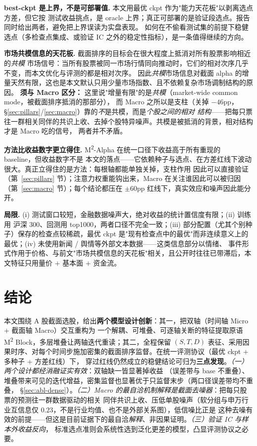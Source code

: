 \documentclass[a4paper,11pt,fontset=fandol]{ctexart}
\newcommand{\msq}{\texorpdfstring{M\textsuperscript{2}}{M2}}  %
\newcommand{\msqa}{\texorpdfstring{M\textsuperscript{2}-Alpha}{M2-Alpha}} %
\begin{document}
\textbf{\heiti best-ckpt 是上界，不是可部署值.} 本文用最优 ckpt 作为"能力天花板"以剥离选点方差，但它按
测试收益挑点，是 oracle 上界；真正可部署的是验证段选点。报告同时给出两者，避免把上界误读为实盘表现。
如何在不偷看测试集的前提下稳健选点（多检查点集成、或验证 IC 之外的稳定性指标），是一条值得继续的方向。

\textbf{\heiti 市场共模信息的天花板.} 截面排序的目标会在很大程度上抵消对所有股票影响相近的\emph{共模}
市场信号：当所有股票被同一市场行情同向推动时，它们的相对次序几乎不变，而本文优化与评测的都是相对次序。
因此\emph{共模}市场信息对截面 alpha 的增量天然有限，这也是本文默认只用少量市场指数、且不依赖复杂市场调制结构的原因。
\textbf{\heiti 须与 Macro 区分：} 这里说"增量有限"的是\emph{共模}（market-wide common mode，被截面排序抵消的那部分），
而 Macro 之所以是支柱（关掉 $-46$pp，§\ref{sec:pillars}/\ref{sec:macro}）靠的\emph{不}是共模，而是\emph{个股之间的相对
结构}——把每只票往一群相关同伴的共识上收、去掉个股特异噪声。共模是被抵消的背景，相对结构才是 Macro 吃的信号，
两者并不矛盾。

\textbf{\heiti 方法比收益数字更立得住.} \msqa{} 在统一口径下收益高于所有重现的 baseline，但收益数字不是
本文的落点——它依赖种子与选点、在方差红线下波动很大。真正立得住的是方法：每根轴都能单独关掉，支柱作用
因此可以直接验证（第~\ref{sec:pillars} 节）；注意力权重能钩出来，Macro 在关注谁因此可以被归因
（第~\ref{sec:macro} 节）；每个结论都压在 $\pm60$pp 红线下，真实效应和噪声因此能分开。

\textbf{\heiti 局限.} (i) 测试窗口较短，金融数据噪声大，绝对收益的统计置信度有限；(ii) 训练用
沪深 300、回测用 top1000，两者口径不完全一致；(iii) 部分配置（尤其个别种子）保存的检查点较稀疏，最优 ckpt
是"现有检查点中的最优"而非连续意义上的最优；(iv) 未使用新闻 / 舆情等外部文本数据——这类信息部分以情绪、
事件形式作用于价格、与前文"市场共模信息的天花板"相关，且公开时往往已带滞后，本文特征只用量价 $+$ 基本面 $+$ 资金流。

\section{结论}\label{sec:conclusion}
本文围绕 A 股截面选股，给出\textbf{两个模型设计创新}：其一，把双轴（时间轴 Micro $+$ 截面轴 Macro）交互重构为
一个解耦、可堆叠、可逐轴关断的特征提取原语 \msq{} Block，多层堆叠让两轴迭代重读；其二，全程保留 $(S,T,D)$
表征、采用因果时序、对每个时间步施加密集的截面排序监督。在统一评测协议（最优 ckpt $+$ 多种子 $+$ 方差红线）下，
穿过红线仍然成立的稳健结论可归为\textbf{三点发现}。\emph{（一）两个设计都经消融证实有效}：双轴缺一皆显著掉收益
（误差带与 base 不重叠）、堆叠带来可见的迭代增益，密集监督也显著优于只监督末步（两口径误差带均不重叠，
§\ref{sec:abl-dense}）。\emph{（二）Macro 的最自洽机制解释是截面去噪器}：把每只股票的预测往一群数据驱动的相关
同伴共识上收、压低单股噪声（软分组与申万行业互信息仅 $0.23$，不是行业均值、也不是外部关系图），低信噪比正是
这种去噪有效的前提——但这是目前证据下的最自洽\emph{解释}、非因果证明。\emph{（三）验证 IC 与样本外收益反向}，
标准选点准则会系统性选到泛化更差的模型，凸显评测协议之必要。
\end{document}
